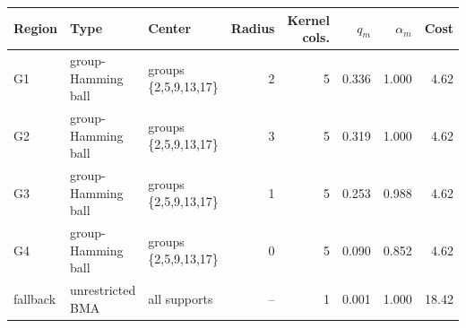\begin{tabularx}{\textwidth}{@{}llXrrrrr@{}}
\toprule
Region & Type & Center & Radius & Kernel cols. & $q_m$ & $\alpha_m$ & Cost \\
\midrule
G1 & group-Hamming ball & groups \{2,5,9,13,17\} & 2 & 5 & 0.336 & 1.000 & 4.62 \\
G2 & group-Hamming ball & groups \{2,5,9,13,17\} & 3 & 5 & 0.319 & 1.000 & 4.62 \\
G3 & group-Hamming ball & groups \{2,5,9,13,17\} & 1 & 5 & 0.253 & 0.988 & 4.62 \\
G4 & group-Hamming ball & groups \{2,5,9,13,17\} & 0 & 5 & 0.090 & 0.852 & 4.62 \\
fallback & unrestricted BMA & all supports & -- & 1 & 0.001 & 1.000 & 18.42 \\
\bottomrule
\end{tabularx}
